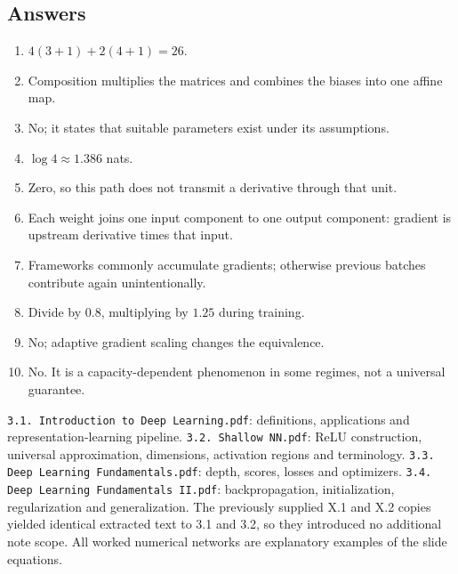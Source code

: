 \documentclass[11pt]{article}
\begin{document}
\subsection{Answers}
\begin{enumerate}
\item $4(3+1)+2(4+1)=26$.
\item Composition multiplies the matrices and combines the biases into one affine map.
\item No; it states that suitable parameters exist under its assumptions.
\item $\log4\approx1.386$ nats.
\item Zero, so this path does not transmit a derivative through that unit.
\item Each weight joins one input component to one output component: gradient is upstream derivative times that input.
\item Frameworks commonly accumulate gradients; otherwise previous batches contribute again unintentionally.
\item Divide by $0.8$, multiplying by $1.25$ during training.
\item No; adaptive gradient scaling changes the equivalence.
\item No. It is a capacity-dependent phenomenon in some regimes, not a universal guarantee.
\end{enumerate}
\texttt{3.1. Introduction to Deep Learning.pdf}: definitions, applications and representation-learning pipeline. \texttt{3.2. Shallow NN.pdf}: ReLU construction, universal approximation, dimensions, activation regions and terminology. \texttt{3.3. Deep Learning Fundamentals.pdf}: depth, scores, losses and optimizers. \texttt{3.4. Deep Learning Fundamentals II.pdf}: backpropagation, initialization, regularization and generalization. The previously supplied X.1 and X.2 copies yielded identical extracted text to 3.1 and 3.2, so they introduced no additional note scope. All worked numerical networks are explanatory examples of the slide equations.
\end{document}
